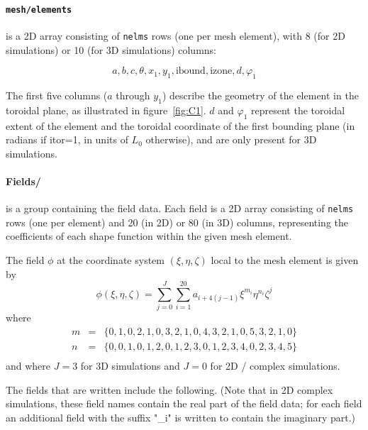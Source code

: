 \paragraph{\texttt{mesh/elements}} is a 2D array consisting of
\texttt{nelms} rows (one per mesh element), with 8 (for 2D
simulations) or 10 (for 3D simulations) columns:

\[ a, b, c, \theta, x_1, y_1, \text{ibound}, \text{izone}, d, \varphi_1 \]

The first five columns ($a$ through $y_1$) describe the geometry of
the element in the toroidal plane, as illustrated in
figure~\ref{fig:C1}.  $d$ and $\varphi_1$ represent the toroidal
extent of the element and the toroidal coordinate of the first
bounding plane (in radians if itor=1, in units of $L_0$ otherwise),
and are only present for 3D simulations.

\paragraph{Fields/} is a group containing the field data.  Each field
is a 2D array consisting of \texttt{nelms} rows (one per element) and
20 (in 2D) or 80 (in 3D) columns, representing the coefficients of
each shape function within the given mesh element.

The field $\phi$ at the coordinate system $(\xi,\eta,\zeta)$ local to the mesh element is given by
\[ 
  \phi(\xi,\eta,\zeta) = \sum_{j=0}^{J} \sum_{i=1}^{20} a_{i + 4(j-1)} \xi^{m_i} \eta^{n_i} \zeta^j
\]
where
\begin{eqnarray*}
   m & = & \{0,1,0,2,1,0,3,2,1,0,4,3,2,1,0,5,3,2,1,0 \}\\
   n & = & \{0,0,1,0,1,2,0,1,2,3,0,1,2,3,4,0,2,3,4,5 \}\\
\end{eqnarray*}
and where $J=3$ for 3D simulations and $J=0$ for 2D / complex simulations.

The fields that are written include the following.  (Note that in 2D
complex simulations, these field names contain the real part of the
field data; for each field an additional field with the suffix "\_i"
is written to contain the imaginary part.)


